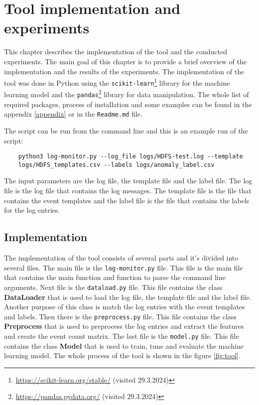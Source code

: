 \chapter{Tool implementation and experiments}

This chapter describes the implementation of the tool and the conducted experiments. 
The main goal of this chapter is to provide a brief overview of the implementation and the results of the experiments.
The implementation of the tool was done in Python using the \texttt{scikit-learn}\footnote{\url{https://scikit-learn.org/stable/} (visited 29.3.2024)}
library for the machine learning model and the \texttt{pandas}\footnote{\url{https://pandas.pydata.org/} (visited 29.3.2024)} library for data manipulation.
The whole list of required packages, process of installation and some examples can be found in the appendix \ref{appendix} or in the \texttt{Readme.md} file.

The script can be run from the command line and this is an example run of the script:
\begin{verbatim}
    python3 log-monitor.py --log_file logs/HDFS-test.log --template 
    logs/HDFS_templates.csv --labels logs/anomaly_label.csv
\end{verbatim}

The input parameters are the log file, the template file and the label file. The log file is the log file that contains the log messages. 
The template file is the file that contains the event templates and the label file is the file that contains the labels for the log entries.

\section{Implementation}

The implementation of the tool consists of several parts and it's divided into several files. 
The main file is the \texttt{log-monitor.py} file. This file is the main file that contains the main function and function to parse the command line arguments.
Next file is the \texttt{dataload.py} file. This file contains the class \textbf{DataLoader} that is used to load the log file, the template file and the label file. Another
purpose of this class is match the log entries with the event templates and labels.
Then there is the \texttt{preprocess.py} file. This file contains the class \textbf{Preprocess} that is used to preprocess the log entries and extract the features and create the 
event count matrix. 
The last file is the \texttt{model.py} file. This file contains the class \textbf{Model} that is used to train, tune and evaluate the machine learning model.
The whole process of the tool is shown in the figure \ref{fig:tool}.

